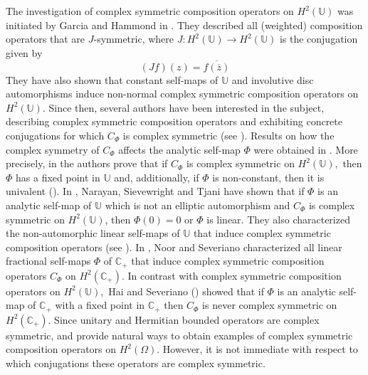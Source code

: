 \documentclass[11pt]{amsart}%
\theoremstyle{definition}
\theoremstyle{remark}
\numberwithin{equation}{section}
\begin{document}
The investigation of complex symmetric composition operators on $H^{2}%
(\mathbb{U})$ was initiated by Garcia and Hammond in \cite{Garc1}. They
described all (weighted) composition operators that are $J$-symmetric, where
$J:H^{2}(\mathbb{U})\longrightarrow H^{2}(\mathbb{U})$ is the conjugation
given by
\[
(Jf)(z)=\overline{f(\overline{z})}%
\]
They have also shown that constant self-maps of $\mathbb{U}$ and involutive
disc automorphisms induce non-normal complex symmetric composition operators
on $H^{2}(\mathbb{U}).$ Since then, several authors have been interested in
the subject, describing complex symmetric composition operators and exhibiting
concrete conjugations for which $C_{\Phi}$ is complex symmetric (see
\cite{Wal, Hai, Han, Narayan}). Results on how the complex symmetry of
$C_{\Phi}$ affects the analytic self-map $\Phi$ were obtained in
\cite{Wal,Garc1}. More precisely, in \cite[Proposition p. 106]{Wal} the
authors prove that if $C_{\Phi}$ is complex symmetric on $H^{2}(\mathbb{U}),$
then $\Phi$ has a fixed point in $\mathbb{U}$ and, additionally, if $\Phi$ is
non-constant, then it is univalent (\cite[Proposition 2.5]{Garc1}). In
\cite[Theorem 2.5]{Maria}, Narayan, Sievewright and Tjani have shown that if
$\Phi$ is an analytic self-map of $\mathbb{U}$ which is not an elliptic
automorphism and $C_{\Phi}$ is complex symmetric on $H^{2}(\mathbb{U})$, then
$\Phi(0)=0$ or $\Phi$ is linear. They also characterized the non-automorphic
linear self-maps of $\mathbb{U}$ that induce complex symmetric composition
operators (see \cite[Theorem 3.1]{Maria}). In \cite{Osmar}, Noor and Severiano
characterized all linear fractional self-maps $\Phi$ of $\mathbb{C}_{+}$ that
induce complex symmetric composition operators $C_{\Phi}$ on $H^{2}%
(\mathbb{C}_{+}).$ In contrast with complex symmetric composition operators on
$H^{2}(\mathbb{U}),$ Hai and Severiano (\cite[Theorem 8.8]{Hai2}) showed that
if $\Phi$ is an analytic self-map of $\mathbb{C}_{+}$ with a fixed point in
$\mathbb{C}_{+}$ then $C_{\Phi}$ is never complex symmetric on $H^{2}%
(\mathbb{C}_{+})$. Since unitary and Hermitian bounded operators are complex
symmetric, \cite[Theorem 3.3]{Gajath} and \cite[Theorem 3.2]{Jovic} provide
natural ways to obtain examples of complex symmetric composition operators on
$H^{2}(\Omega).$ However, it is not immediate with respect to which
conjugations these operators are complex symmetric.
\end{document}
